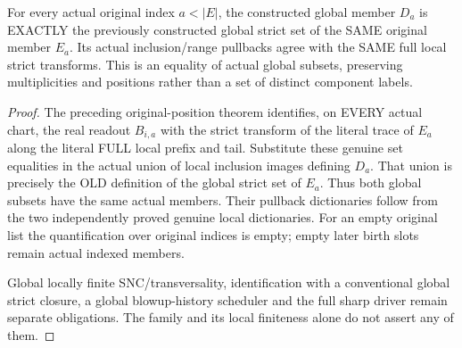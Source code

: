 \begin{theorem}
\label{hir:sharp-actual-global-boundary-original-position-dictionary}
\leanok
For every actual original index $a<|E|$, the constructed global member
$D_a$ is EXACTLY the previously constructed global strict set of the
SAME original member $E_a$. Its actual inclusion/range pullbacks agree
with the SAME full local strict transforms.
This is an equality of actual global subsets, preserving multiplicities
and positions rather than a set of distinct component labels.
\end{theorem}
\begin{proof}
The preceding original-position theorem identifies, on EVERY actual
chart, the real readout $B_{i,a}$ with the strict transform of the literal
trace of $E_a$ along the literal FULL local prefix and tail. Substitute
these genuine set equalities in the actual union of local inclusion
images defining $D_a$. That union is precisely the OLD definition of the
global strict set of $E_a$. Thus both global subsets have the same actual
members. Their pullback dictionaries follow from the two independently
proved genuine local dictionaries. For an empty original list the
quantification over original indices is empty; empty later birth slots
remain actual indexed members.

Global locally finite SNC/transversality, identification with a conventional
global strict closure, a global blowup-history scheduler and the full sharp
driver remain separate obligations. The family and its local finiteness
alone do not assert any of them.
\end{proof}
